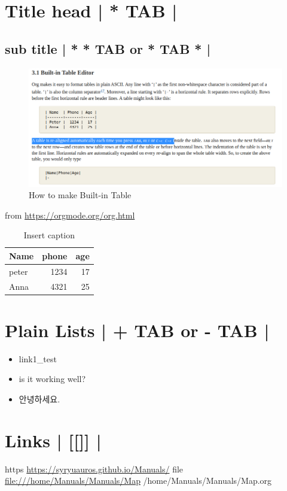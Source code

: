\documentclass[11pt]{article}
\author{JJ Kim}
\date{\today}
\title{}
\begin{document}
\tableofcontents

\section{Title head  | *  TAB |}
\label{sec:org065f93d}
\subsection{sub title | * * TAB or * TAB * |}
\label{sec:org982543c}
 \begin{figure}[htbp]
\centering
\includegraphics[width=.9\linewidth]{./img/samples/samples1.png}
\caption{\label{fig:a-1}How to make Built-in Table}
\end{figure}
from \url{https://orgmode.org/org.html}

\begin{table}[htbp]
\caption{\label{table: 1}Insert caption}
\centering
\begin{tabular}{lrr}
Name & phone & age\\
\hline
peter & 1234 & 17\\
Anna & 4321 & 25\\
\end{tabular}
\end{table}



\section{Plain Lists | + TAB or - TAB |}
\label{sec:orgba9a17f}
\begin{itemize}
\item link1\_test
\item is it working well?
\item 안녕하세요.
\end{itemize}


\section{Links | [[]] |}
\label{sec:orgb22f0cf}
https    \url{https://syryuauros.github.io/Manuals/}
file       \url{file:///home/Manuals/Manuals/Map}
             /home/Manuals/Manuals/Map.org
\end{document}
